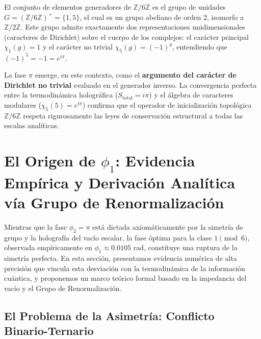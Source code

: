 \documentclass[12pt,a4paper]{article}
\theoremstyle{plain}
\theoremstyle{definition}
\theoremstyle{remark}
\begin{document}
El conjunto de elementos generadores de $\mathbb{Z}/6\mathbb{Z}$ es el grupo de unidades $G = (\mathbb{Z}/6\mathbb{Z})^{\times} = \{1,5\}$, el cual es un grupo abeliano de orden 2, isomorfo a $\mathbb{Z}/2\mathbb{Z}$. Este grupo admite exactamente dos representaciones unidimensionales (caracteres de Dirichlet) sobre el cuerpo de los complejos: el carácter principal $\chi_1(g) = 1$ y el carácter no trivial $\chi_5(g) = (-1)^g$, entendiendo que $(-1)^5 = -1 = e^{i\pi}$.

La fase $\pi$ emerge, en este contexto, como el \textbf{argumento del carácter de Dirichlet no trivial} evaluado en el generador inverso. La convergencia perfecta entre la termodinámica holográfica ($S_{\text{total}} = i\pi$) y el álgebra de caracteres modulares ($\chi_5(5) = e^{i\pi}$) confirma que el operador de inicialización topológica $\mathbb{Z}/6\mathbb{Z}$ respeta rigurosamente las leyes de conservación estructural a todas las escalas analíticas.

\section{El Origen de $\phi_1$: Evidencia Empírica y Derivación Analítica vía Grupo de Renormalización}
\label{sec:origen_phi1}

Mientras que la fase $\phi_2 = \pi$ está dictada axiomáticamente por la simetría de grupo y la holografía del vacío escalar, la fase óptima para la clase $1 \pmod 6$, observada empíricamente en $\phi_1 \approx 0.0105$ rad, constituye una ruptura de la simetría perfecta. En esta sección, presentamos evidencia numérica de alta precisión que vincula esta desviación con la termodinámica de la información cuántica, y proponemos un marco teórico formal basado en la impedancia del vacío y el Grupo de Renormalización.

\subsection{El Problema de la Asimetría: Conflicto Binario-Ternario}
\end{document}
